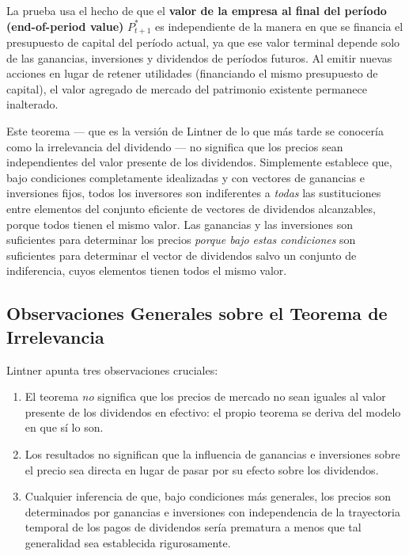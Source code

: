 \documentclass[12pt]{article}
\begin{document}
La prueba usa el hecho de que el \textbf{valor de la empresa al final del per\'iodo (end-of-period value)} $P^*_{t+1}$ es independiente de la manera en que se financia el presupuesto de capital del per\'iodo actual, ya que ese valor terminal depende solo de las ganancias, inversiones y dividendos de per\'iodos futuros. Al emitir nuevas acciones en lugar de retener utilidades (financiando el mismo presupuesto de capital), el valor agregado de mercado del patrimonio existente permanece inalterado.

\begin{explicacion}
Este teorema --- que es la versi\'on de Lintner de lo que m\'as tarde se conocer\'ia como la irrelevancia del dividendo --- no significa que los precios sean independientes del valor presente de los dividendos. Simplemente establece que, bajo condiciones completamente idealizadas y con vectores de ganancias e inversiones fijos, todos los inversores son indiferentes a \textit{todas} las sustituciones entre elementos del conjunto eficiente de vectores de dividendos alcanzables, porque todos tienen el mismo valor. Las ganancias y las inversiones son suficientes para determinar los precios \textit{porque bajo estas condiciones} son suficientes para determinar el vector de dividendos salvo un conjunto de indiferencia, cuyos elementos tienen todos el mismo valor.
\end{explicacion}

\subsection{Observaciones Generales sobre el Teorema de Irrelevancia}

Lintner apunta tres observaciones cruciales:

\begin{enumerate}
  \item El teorema \textit{no} significa que los precios de mercado no sean iguales al valor presente de los dividendos en efectivo: el propio teorema se deriva del modelo en que s\'i lo son.

  \item Los resultados no significan que la influencia de ganancias e inversiones sobre el precio sea directa en lugar de pasar por su efecto sobre los dividendos.

  \item Cualquier inferencia de que, bajo condiciones m\'as generales, los precios son determinados por ganancias e inversiones con independencia de la trayectoria temporal de los pagos de dividendos ser\'ia prematura a menos que tal generalidad sea establecida rigurosamente.
\end{enumerate}
\end{document}

